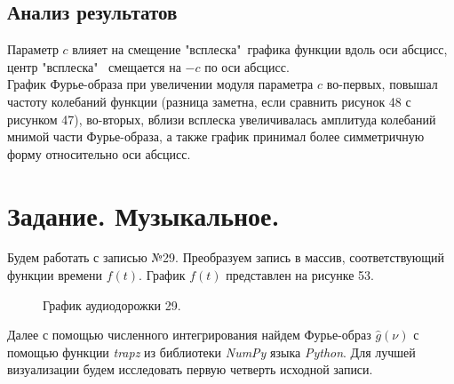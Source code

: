 \documentclass[a5paper, 10pt]{article}
\theoremstyle{definition}
\theoremstyle{plain}
\theoremstyle{remark}
\begin{document}
\newpage
\subsection{Анализ результатов}

Параметр $c$ влияет на смещение "всплеска"\, графика функции вдоль оси абсцисс, центр "всплеска" \, смещается на $-c$ по оси абсцисс.\\

График Фурье-образа при увеличении модуля параметра $c$ во-первых, повышал частоту колебаний функции (разница заметна, если сравнить рисунок 48 с рисунком 47), во-вторых, вблизи всплеска увеличивалась амплитуда колебаний мнимой части Фурье-образа, а также график принимал более симметричную форму относительно оси абсцисс.



\newpage
\section{Задание. Музыкальное.}
Будем работать с записью №29. Преобразуем запись в массив, соответствующий функции времени $f(t)$. График $f(t)$ представлен на рисунке 53.

\begin{figure}[h!]
\caption{График аудиодорожки 29.}
\end{figure}

Далее с помощью численного интегрирования найдем Фурье-образ $\hat{g}(\nu)$ с помощью функции \textit{trapz} из библиотеки \textit{NumPy} языка \textit{Python}. Для лучшей визуализации будем исследовать первую четверть исходной записи.
\end{document}
